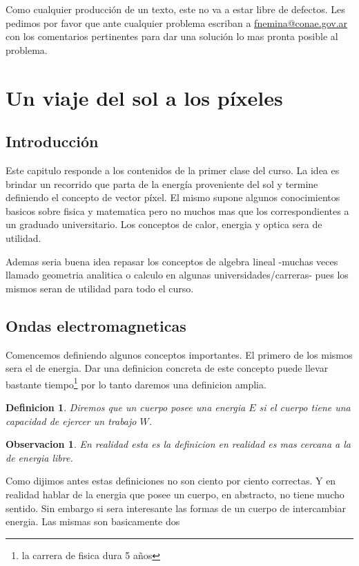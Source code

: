 \documentclass[a4paper,12pt]{article}
\newtheorem{dex}{Definicion}[section]
\newtheorem*{obs}{Observacion}
\begin{document}
Como cualquier producción de un texto, este no va a estar libre de defectos. Les
pedimos por favor que ante cualquier problema escriban a
\url{fnemina@conae.gov.ar} con los comentarios pertinentes para dar una solución
lo mas pronta posible al problema.

\section{Un viaje del sol a los píxeles}

\subsection{Introducción}
Este capitulo responde a los contenidos de la primer clase del curso. La idea es
brindar un recorrido que parta de la energía proveniente del sol y termine
definiendo el concepto de vector píxel. El mismo supone algunos conocimientos
basicos sobre fisica y matematica pero no muchos mas que los correspondientes a
un graduado universitario. Los conceptos de calor, energia y optica sera de
utilidad.

Ademas seria buena idea repasar los conceptos de algebra lineal -muchas veces
llamado geometria analitica o calculo en algunas universidades/carreras- pues
los mismos seran de utilidad para todo el curso.

\subsection{Ondas electromagneticas}

Comencemos definiendo algunos conceptos importantes. El primero de los mismos
sera el de energia. Dar una definicion concreta de este concepto puede llevar
bastante tiempo\footnote{la carrera de fisica dura 5 años} por lo tanto daremos
una definicion amplia.
\begin{dex}
  Diremos que un cuerpo posee una energia $E$ si el cuerpo tiene una capacidad de
  ejercer un trabajo $W$.
\end{dex}

\begin{obs}
  En realidad esta es la definicion en realidad es mas cercana a la de energia
  libre.
\end{obs}

Como dijimos antes estas definiciones no son ciento por ciento correctas. Y en
realidad hablar de la energia que posee un cuerpo, en abstracto, no tiene mucho
sentido. Sin embargo si sera interesante las formas de un cuerpo de intercambiar
energia. Las mismas son basicamente dos
\end{document}

